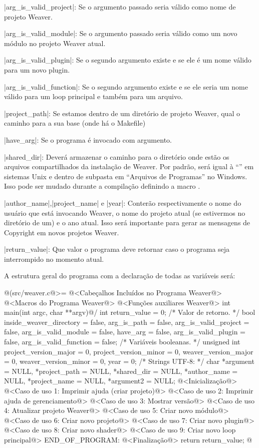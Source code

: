 |arg_is_valid_project|: Se o argumento passado seria válido como
  nome de projeto Weaver.

|arg_is_valid_module|: Se o argumento passado seria válido como
  um novo módulo no projeto Weaver atual.

|arg_is_valid_plugin|: Se o segundo argumento existe e se ele é um
 nome válido para um novo plugin.

|arg_is_valid_function|: Se o segundo argumento existe e se ele seria
 um nome válido para um loop principal e também para um arquivo.

|project_path|: Se estamos dentro de um diretório de projeto
  Weaver, qual o caminho para a sua base (onde há o Makefile)

|have_arg|: Se o programa é invocado com argumento.

|shared_dir|: Deverá armazenar o caminho para o diretório onde estão
  os arquivos compartilhados da instalação de Weaver. Por padrão, será
  igual à ``'' em sistemas Unix e
  dentro de subpasta em ``Arquivos de Programas'' no Windows. Isso
  pode ser mudado durante a compilação definindo a
  macro .

|author_name|,|project_name| e |year|: Conterão respectivamente o
  nome do usuário que está invocando Weaver, o nome do projeto atual
  (se estivermos no diretório de um) e o ano atual. Isso será
  importante para gerar as mensagens de Copyright em novos projetos
  Weaver.

|return_value|: Que valor o programa deve retornar caso o programa
  seja interrompido no momento atual.

A estrutura geral do programa com a declaração de todas as variáveis
será:

\iniciocodigo
@(src/weaver.c@>=
@<Cabeçalhos Incluídos no Programa Weaver@>
@<Macros do Programa Weaver@>
@<Funções auxiliares Weaver@>
int main(int argc, char **argv){@/
  int return_value = 0; /* Valor de retorno. */
  bool inside_weaver_directory = false, arg_is_path = false,
    arg_is_valid_project = false, arg_is_valid_module = false,
    have_arg = false, arg_is_valid_plugin = false,
    arg_is_valid_function = false; /* Variáveis booleanas. */
  unsigned int project_version_major = 0, project_version_minor = 0,
    weaver_version_major = 0, weaver_version_minor = 0,
    year = 0;
  /* Strings UTF-8: */
  char *argument = NULL, *project_path = NULL, *shared_dir = NULL,
    *author_name = NULL, *project_name = NULL, *argument2 = NULL;
  @<Inicialização@>
  @<Caso de uso 1: Imprimir ajuda (criar projeto)@>
  @<Caso de uso 2: Imprimir ajuda de gerenciamento@>
  @<Caso de uso 3: Mostrar versão@>
  @<Caso de uso 4: Atualizar projeto Weaver@>
  @<Caso de uso 5: Criar novo módulo@>
  @<Caso de uso 6: Criar novo projeto@>
  @<Caso de uso 7: Criar novo plugin@>
  @<Caso de uso 8: Criar novo shader@>
  @<Caso de uso 9: Criar novo loop principal@>
END_OF_PROGRAM:
  @<Finalização@>
  return return_value;
}
@
\fimcodigo

